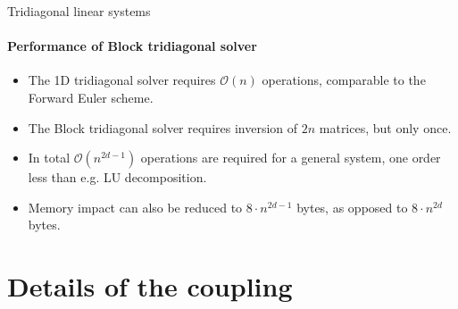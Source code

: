 \documentclass[12pt,a4paper, xcolor={usenames,dvipsnames,svgnames,table}]{beamer}
\begin{document}
\begin{frame}{Tridiagonal linear systems}
 \framesubtitle{Performance of Block tridiagonal solver}
 \begin{itemize}
  \item <1-> The 1D tridiagonal solver requires $\mathcal{O}(n)$ operations, comparable to the Forward Euler scheme.
  \item <2-> The Block tridiagonal solver requires inversion of $2n$ matrices, but only once.
  \item <3-> In total $\mathcal{O}(n^{2d-1})$ operations are required for a general system, one order less than e.g. LU decomposition.
  \item <4-> Memory impact can also be reduced to $8\cdot n^{2d-1}$ bytes, as opposed to $8\cdot n^{2d}$ bytes.
 \end{itemize}
\end{frame}

\section{Details of the coupling}
\end{document}
